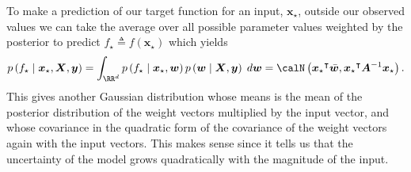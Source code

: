 To make a prediction of our target function for an input, $\bm{x}_{\star}$, outside our observed values we can take the average over all possible parameter values weighted by the posterior to predict $f_{\star} \triangleq f \left( \bm{x}_{\star} \right)$ which yields
\begin{equation*}
    p \left( f_{\star} \mid \bm{x}_{\star} , \bm{X} , \bm{y} \right) = \int_{\RR^d} p \left( f_{\star} \mid \bm{x}_{\star} , \bm{w} \right) p \left( \bm{w} \mid \bm{X} , \bm{y} \right) \; d \bm{w} = \calN \left( {\bm{x}_{\star}}^{\intercal} \bar{\bm{w}} , {\bm{x}_{\star}}^{\intercal} \bm{A}^{-1} \bm{x}_{\star} \right).
\end{equation*}
This gives another Gaussian distribution whose means is the mean of the posterior distribution of the weight vectors multiplied by the input vector, and whose covariance in the quadratic form of the covariance of the weight vectors again with the input vectors. This makes sense since it tells us that the uncertainty of the model grows quadratically with the magnitude of the input.

